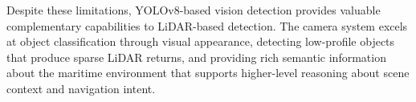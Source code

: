 Despite these limitations, YOLOv8-based vision detection provides valuable complementary capabilities to \ac{LiDAR}-based detection.
The camera system excels at object classification through visual appearance, detecting low-profile objects that produce sparse \ac{LiDAR} returns, and providing rich semantic information about the maritime environment that supports higher-level reasoning about scene context and navigation intent.













